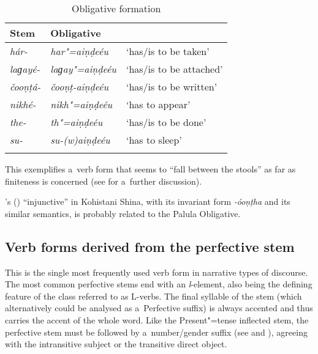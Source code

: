 \begin{table}[ht]
\caption{Obligative formation}

\begin{tabularx}{.75\textwidth}{ l@{\hspace{20pt}} Q l@{\hspace{20pt}} }
\lsptoprule
Stem &
Obligative &
\\\hline
\textit{hár-} &
\textit{har"=aiṇḍeéu} &
`has/is to be taken'\\
\textit{laɡayé-} &
\textit{laɡay"=aiṇḍeéu} &
`has/is to be attached'\\
\textit{čooṇṭá-} &
\textit{čooṇṭ-aiṇḍeéu} &
`has/is to be written'\\
\textit{nikhé-} &
\textit{nikh"=aiṇḍeéu} &
`has to appear'\\
\textit{the-} &
\textit{th"=aiṇḍeéu} &
`has/is to be done'\\
\textit{su-} &
\textit{su-(w)aiṇḍeéu} &
`has to sleep'\\\lspbottomrule
\end{tabularx}
\label{tab:8-27}
\end{table}


This exemplifies a~verb form that seems to ``fall between the stools'' as far as finiteness is concerned (see  for a~further discussion).



\citeauthor{schmidt2003}'s (\citeyear[139]{schmidt2003}) ``injunctive'' in Kohistani Shina, with its invariant form \textit{-óoṇṭha} and its similar semantics, is probably related to the Palula Obligative.


\subsection{Verb forms derived from the perfective stem}
\label{subsec:8-4-3}

 This is the single most frequently used verb form in
narrative types of discourse. The most common perfective stems end with an \textit{l}-element,
also being the defining feature of the class referred to as L-verbs. The final syllable of the stem
(which alternatively could be analysed as a~Perfective suffix) is always accented and thus carries
the accent of the whole word. Like the Present"=tense inflected stem, the perfective stem must be
followed by a~number/gender suffix (see  and ), agreeing with
the intransitive subject or the transitive direct object.



